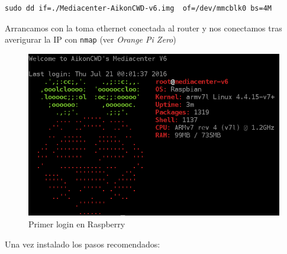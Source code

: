 \documentclass[12pt,spanish,]{scrartcl}
\begin{document}
\begin{verbatim}
sudo dd if=./Mediacenter-AikonCWD-v6.img  of=/dev/mmcblk0 bs=4M
\end{verbatim}

Arrancamos con la toma ethernet conectada al router y nos conectamos
tras averigurar la IP con \texttt{nmap} (ver \emph{Orange Pi Zero})

\begin{figure}
\centering
\includegraphics{src/img/RaspiFirstLogin.png}
\caption{Primer login en Raspberry}
\end{figure}

Una vez instalado los pasos recomendados:
\end{document}
